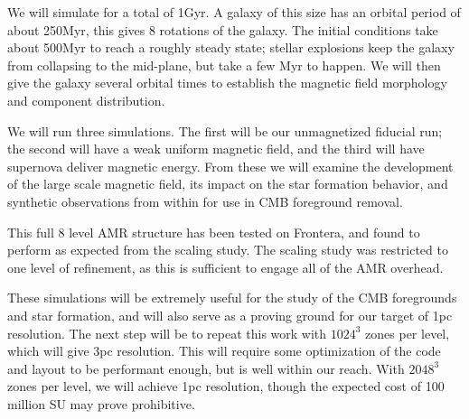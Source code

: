 We will simulate for a total of 1Gyr.  A galaxy of this size has an orbital
period of about 250Myr, this gives 8 rotations of the galaxy.  The initial
conditions take about 500Myr to reach a roughly steady state; stellar explosions
keep the galaxy from collapsing to the mid-plane, but take a few Myr to happen.  
We will then give the galaxy several orbital times to establish the magnetic
field morphology and component distribution.  

We will run three simulations.  The first will be our unmagnetized fiducial run;  the second will
have a weak uniform magnetic field, and the third will have supernova deliver
magnetic energy.  From these we will examine the development of the large scale
magnetic field, its impact on the star formation behavior, and synthetic
observations from within for use in CMB foreground removal.  

This full 8 level AMR structure has been tested on Frontera, and found to perform as
expected from the scaling study.  The scaling study was restricted to one level
of refinement, as this is sufficient to engage all of the AMR overhead.  

These simulations will be extremely useful for the study of the CMB foregrounds
and star formation, and will also serve as a proving ground for our target of
1pc resolution.  The next step will be to repeat this work with $1024^3$ zones
per level, which will give 3pc resolution.  This will require some optimization
of the code and layout to be performant enough, but is well within our reach.  With $2048^3$ zones per level,
we will achieve 1pc resolution, though the expected cost of 100 million SU may
prove prohibitive.  

